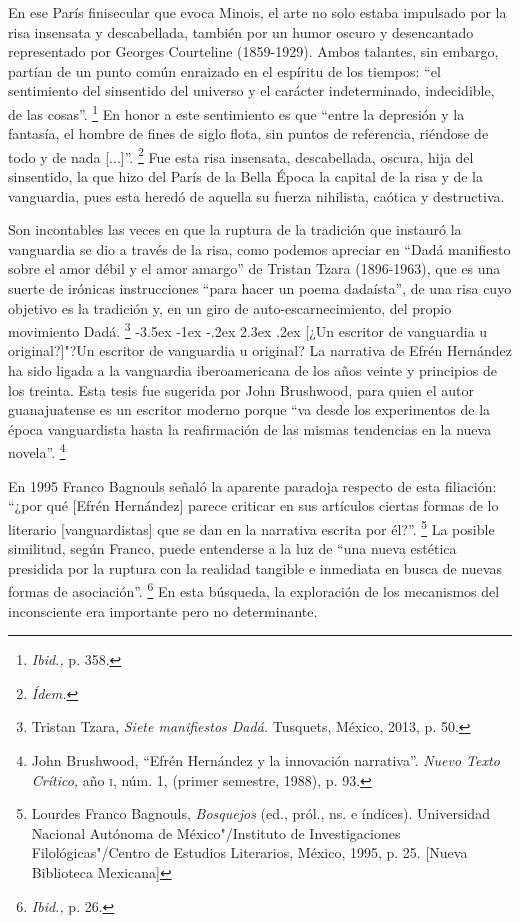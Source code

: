 \documentclass[14pt,twoside,final]{extbook} %
\makeatletter
\let\oldfootnote\footnote
\renewcommand\footnote[1]{%
\oldfootnote{\hspace{1mm}#1}}
\renewcommand\section{\@startsection {section}{1}{\z@}%
                                     {-3.5ex \@plus -1ex \@minus -.2ex}%
                                     {2.3ex \@plus .2ex}%
                                     {\normalfont\large\bfseries\sc}}
\makeatother
\begin{document}
En ese París finisecular que evoca Minois, el arte no solo estaba impulsado por la risa insensata y descabellada, también por un humor oscuro y desencantado representado por Georges Courteline (1859-1929). Ambos talantes, sin embargo, partían de un punto común enraizado en el espíritu de los tiempos: ``el sentimiento del sinsentido del universo y el carácter indeterminado, indecidible, de las cosas''.\footnote{\emph{Ibid.,} p. 358.} En honor a este sentimiento es que ``entre la depresión y la fantasía, el hombre de fines de siglo flota, sin puntos de referencia, riéndose de todo y de nada [...]''.\footnote{\em Ídem.} Fue esta risa insensata, descabellada, oscura, hija del sinsentido, la que hizo del París de la Bella Época la capital de la risa y de la vanguardia, pues esta heredó de aquella su fuerza nihilista, caótica y destructiva.

Son incontables las veces en que la ruptura de la tradición que instauró la vanguardia se dio a través de la risa, como podemos apreciar en ``Dadá manifiesto sobre el amor débil y el amor amargo'' de Tristan Tzara (\mbox{1896-1963}), que es una suerte de irónicas instrucciones ``para hacer un poema dadaísta'', de una risa cuyo objetivo es la tradición y, en un giro de auto-escarnecimiento, del propio movimiento Dadá.\footnote{Tristan Tzara, \emph{Siete manifiestos Dadá.} Tusquets, México, 2013, p. 50.}
\section[¿Un escritor de vanguardia u original?]{"?Un escritor de vanguardia u original?}\label{sec:un-escritor-de-vanguardia-u-original}
La narrativa de Efrén Hernández ha sido ligada a la vanguardia iberoamericana de los años veinte y principios de los treinta. Esta tesis fue sugerida por John Brushwood, para quien el autor guanajuatense es un escritor moderno porque ``va desde los experimentos de la época vanguardista hasta la reafirmación de las mismas tendencias en la nueva novela''.\footnote{John Brushwood, ``Efrén Hernández y la innovación narrativa''. \emph{Nuevo Texto Crítico,} año \textsc{i}, núm. 1, (primer semestre, 1988), p. 93.}\protect\enlargethispage*{\baselineskip}

En 1995 Franco Bagnouls señaló la aparente paradoja respecto de esta filiación: ``¿por qué [Efrén Hernández] parece criticar en sus artículos ciertas formas de lo literario [vanguardistas] que se dan en la narrativa escrita por él?''.\footnote{Lourdes Franco Bagnouls, \emph{Bosquejos} (ed., pról., ns. e índices). Universidad Nacional Autónoma de México"/Instituto de Investigaciones Filológicas"/Centro de Estudios Literarios, México, 1995, p. 25. [Nueva Biblioteca Mexicana]} La posible similitud, según Franco, puede entenderse a la luz de ``una nueva estética presidida por la ruptura con la realidad tangible e inmediata en busca de nuevas formas de asociación''.\footnote{\emph{Ibid.,} p. 26.} En esta búsqueda, la exploración de los mecanismos del inconsciente era importante pero no determinante.
\end{document}
